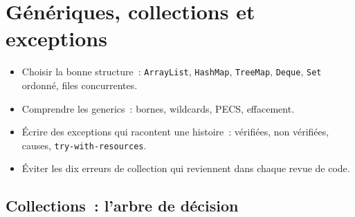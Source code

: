\chapter{G\'en\'eriques, collections et exceptions}
\label{ch-java-collections}

\begin{objectif}
\begin{itemize}
  \item Choisir la bonne structure~: \verb|ArrayList|, \verb|HashMap|, \verb|TreeMap|, \verb|Deque|,
        \verb|Set| ordonn\'e, files concurrentes.
  \item Comprendre les generics~: bornes, wildcards, PECS, effacement.
  \item \'Ecrire des exceptions qui racontent une histoire~: v\'erifi\'ees, non v\'erifi\'ees, causes,
        \verb|try-with-resources|.
  \item \'Eviter les dix erreurs de collection qui reviennent dans chaque revue de code.
\end{itemize}
\end{objectif}

\section{Collections~: l'arbre de d\'ecision}

